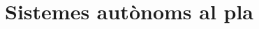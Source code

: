 \documentclass[../../main.tex]{subfiles}
\begin{document}

\chapter{Sistemes autònoms al pla}
\end{document}
